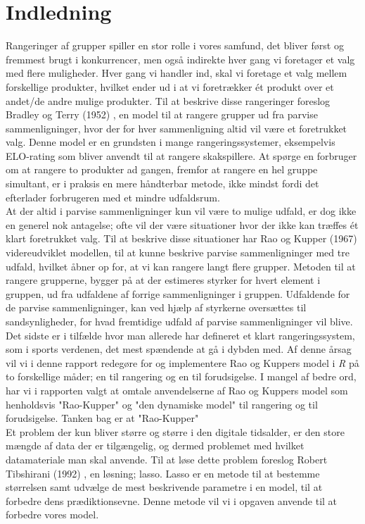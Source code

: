 \documentclass[11pt,a4paper]{article}
\begin{document}
\section{Indledning}
Rangeringer af grupper spiller en stor rolle i vores samfund, det bliver først og fremmest brugt i konkurrencer, men også indirekte hver gang vi foretager et valg med flere muligheder. Hver gang vi handler ind, skal vi foretage et valg mellem forskellige produkter, hvilket ender ud i at vi foretrækker ét produkt over et andet/de andre mulige produkter. Til at beskrive disse rangeringer foreslog Bradley og Terry (1952) \cite{BradleyTerry}, en model til at rangere grupper ud fra parvise sammenligninger, hvor der for hver sammenligning altid vil være et foretrukket valg. Denne model er en grundsten i mange rangeringssystemer, eksempelvis ELO-rating som bliver anvendt til at rangere skakspillere. At spørge en forbruger om at rangere to produkter ad gangen, fremfor at rangere en hel gruppe simultant, er i praksis en mere håndterbar metode, ikke mindst fordi det efterlader forbrugeren med et mindre udfaldsrum.\\
At der altid i parvise sammenligninger kun vil være to mulige udfald, er dog ikke en generel nok antagelse; ofte vil der være situationer hvor der ikke kan træffes ét klart foretrukket valg. Til at beskrive disse situationer har Rao og Kupper (1967) \cite{RaoKupper} videreudviklet modellen, til at kunne beskrive parvise sammenligninger med tre udfald, hvilket åbner op for, at vi kan rangere langt flere grupper. Metoden til at rangere grupperne, bygger på at der estimeres styrker for hvert element i gruppen, ud fra udfaldene af forrige sammenligninger i gruppen. Udfaldende for de parvise sammenligninger, kan ved hjælp af styrkerne oversættes til sandsynligheder, for hvad fremtidige udfald af parvise sammenligninger vil blive. Det sidste er i tilfælde hvor man allerede har defineret et klart rangeringssystem, som i sports verdenen, det mest spændende at gå i dybden med. Af denne årsag vil vi i denne rapport redegøre for og implementere Rao og Kuppers model i \textit{R} på to forskellige måder; en til rangering og en til forudsigelse. I mangel af bedre ord, har vi i rapporten valgt at omtale anvendelserne af Rao og Kuppers model som henholdsvis "Rao-Kupper" og "den dynamiske model" til rangering og til forudsigelse. Tanken bag er at "Rao-Kupper" \\
Et problem der kun bliver større og større i den digitale tidsalder, er den store mængde af data der er tilgængelig, og dermed problemet med hvilket datamateriale man skal anvende. Til at løse dette problem foreslog Robert Tibshirani (1992) \cite{RobertTibshirani}, en løsning; lasso. Lasso er en metode til at bestemme størrelsen samt udvælge de mest beskrivende parametre i en model, til at forbedre dens prædiktionsevne. Denne metode vil vi i opgaven anvende til at forbedre vores model.   
\end{document}
